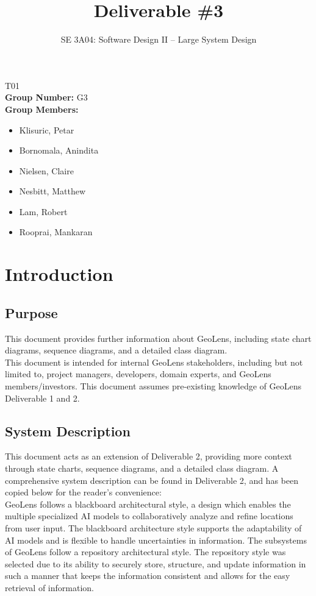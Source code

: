 \documentclass[]{article}
\title{Deliverable \#3}
\author{SE 3A04: Software Design II -- Large System Design}
\date{}
\begin{document}
\maketitle
{} T01\\
{\bf Group Number:} G3 \\
{\bf Group Members:} 
\begin{itemize}
    \item Klisuric, Petar
    \item Bornomala, Anindita
    \item Nielsen, Claire
    \item Nesbitt, Matthew
    \item Lam, Robert 
    \item Rooprai, Mankaran
\end{itemize}


\section{Introduction}
\label{sec:introduction}

\subsection{Purpose}
\label{sub:purpose}
This document provides further information about GeoLens, including state chart diagrams,
sequence diagrams, and a detailed class diagram.\medskip \\
This document is intended for internal GeoLens stakeholders, including but not limited to,
project managers, developers, domain experts, and GeoLens members/investors. This document
assumes pre-existing knowledge of GeoLens Deliverable 1 and 2.

\subsection{System Description}
\label{sub:system_description}
This document acts as an extension of Deliverable 2, providing more context through state charts, sequence diagrams,
and a detailed class diagram. A comprehensive system description can be found in Deliverable 2, and has been copied below
for the reader's convenience:\medskip \\
GeoLens follows a blackboard architectural style, a design which enables the multiple specialized AI models to
collaboratively analyze and refine locations from user input. The blackboard architecture style supports the
adaptability of AI models and is flexible to handle uncertainties in information. The subsystems of GeoLens
follow a repository architectural style. The repository style was selected due to its ability to securely store,
structure, and update information in such a manner that keeps the information consistent and allows for the
easy retrieval of information.
\end{document}
